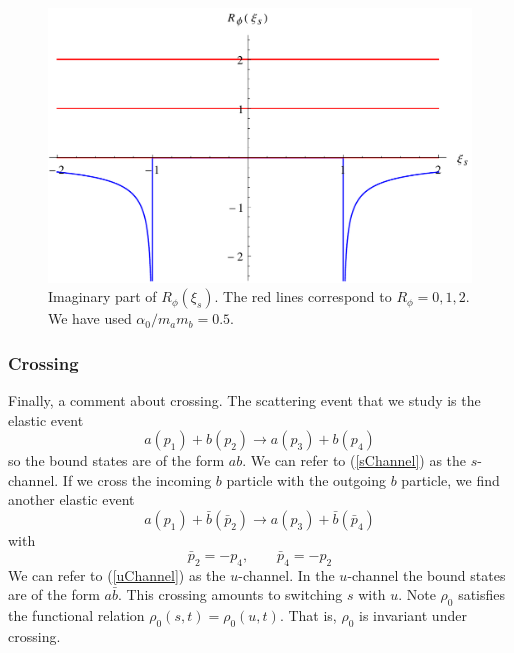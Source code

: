 \begin{figure}
\centering
\includegraphics[scale=0.6]{Plots/ImRPhi.pdf}
\caption[Imaginary part of the Regge trajectory function for the massless scalar exchange model]{Imaginary part of $R_{\phi}(\xi_{s})$. The red lines correspond to $R_{\phi} = 0, 1, 2$. We have used $\alpha_{0} / m_{a} m_{b} = 0.5$.}
\label{ImRPhiFig}
\end{figure}
\subsubsection{Crossing}
Finally, a comment about crossing. The scattering event that we study is the elastic event
\begin{equation}
	a(p_{1}) + b(p_{2}) \longrightarrow a(p_{3}) + b(p_{4}) \label{sChannel}
\end{equation}
so the bound states are of the form $ab$. We can refer to (\ref{sChannel}) as the $s$-channel. If we cross the incoming $b$ particle with the outgoing $b$ particle, we find another elastic event
\begin{equation}
	a(p_{1}) + \bar{b}(\bar{p}_{2}) \longrightarrow a(p_{3}) + \bar{b}(\bar{p}_{4}) \label{uChannel}
\end{equation}
with
\begin{equation}
	\bar{p}_{2} = -p_{4}, \qquad \bar{p}_{4} = -p_{2}
\end{equation}
We can refer to (\ref{uChannel}) as the $u$-channel. In the $u$-channel the bound states are of the form $a \bar{b}$. This crossing amounts to switching $s$ with $u$. Note $\rho_{0}$ satisfies the functional relation $\rho_{0}(s, t) = \rho_{0}(u, t)$. That is, $\rho_{0}$ is invariant under crossing.

